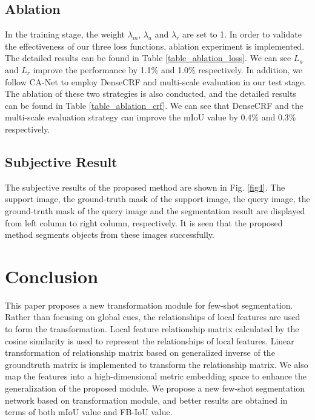 \documentclass[runningheads]{llncs}
\begin{document}
\subsection{Ablation}
 In the training stage, the weight $\lambda_m$, $\lambda_a$ and $\lambda_r$ are set to 1. In order to validate the effectiveness of our three loss functions, ablation experiment is implemented. The detailed results can be found in Table \ref{table_ablation_loss}. We can see $L_a$ and $L_r$ improve the performance by 1.1\% and 1.0\% respectively.
 In addition, we follow CA-Net\cite{ref_cvpr} to employ DenseCRF\cite{ref_crf} and multi-scale evaluation in our test stage. The ablation of these two strategies is also conducted, and the detailed results can be found in Table \ref{table_ablation_crf}. We can see that DenseCRF\cite{ref_crf} and the multi-scale evaluation strategy can improve the mIoU value by 0.4\% and 0.3\% respectively.

\subsection{Subjective Result}
The subjective results of the proposed method are shown in Fig. \ref{fig4}. The support image, the ground-truth mask of the support image, the query image, the ground-truth mask of the query image and the segmentation result are displayed from left column to right column, respectively.  It is seen that the proposed method segments objects from these images successfully.

\section{Conclusion}
This paper proposes a new transformation module for few-shot segmentation. Rather than focusing on global cues, the relationships of local features are used to form the transformation. Local feature relationship matrix calculated by the cosine similarity is used to represent the relationships of local features. Linear transformation of relationship matrix based on generalized inverse of the groundtruth matrix is implemented to transform the relationship matrix. We also map the features into a high-dimensional metric embedding space to enhance the generalization of the proposed module. We propose a new few-shot segmentation network based on transformation module, and better results are obtained in terms of both mIoU value and FB-IoU value.
\end{document}
